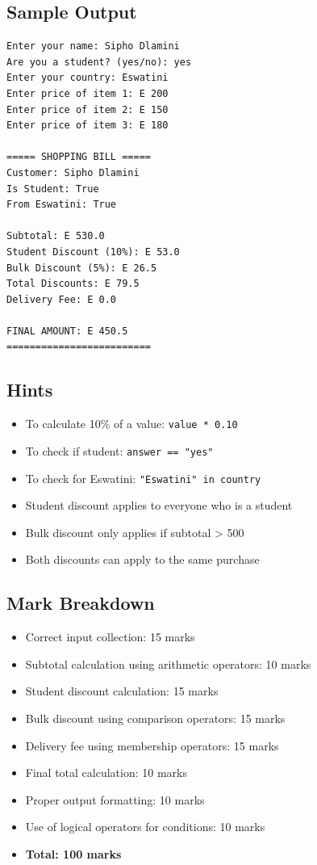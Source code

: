 \documentclass[a4paper,11pt]{article}
\theoremstyle{mytheor}
\begin{document}
\subsection*{Sample Output}

\begin{lstlisting}
Enter your name: Sipho Dlamini
Are you a student? (yes/no): yes
Enter your country: Eswatini
Enter price of item 1: E 200
Enter price of item 2: E 150
Enter price of item 3: E 180

===== SHOPPING BILL =====
Customer: Sipho Dlamini
Is Student: True
From Eswatini: True

Subtotal: E 530.0
Student Discount (10%): E 53.0
Bulk Discount (5%): E 26.5
Total Discounts: E 79.5
Delivery Fee: E 0.0

FINAL AMOUNT: E 450.5
=========================
\end{lstlisting}

\subsection*{Hints}

\begin{itemize}
    \item To calculate 10\% of a value: \texttt{value * 0.10}
    \item To check if student: \texttt{answer == "yes"}
    \item To check for Eswatini: \texttt{"Eswatini" in country}
    \item Student discount applies to everyone who is a student
    \item Bulk discount only applies if subtotal > 500
    \item Both discounts can apply to the same purchase
\end{itemize}

\subsection*{Mark Breakdown}
\begin{itemize}
    \item Correct input collection: 15 marks
    \item Subtotal calculation using arithmetic operators: 10 marks
    \item Student discount calculation: 15 marks
    \item Bulk discount using comparison operators: 15 marks
    \item Delivery fee using membership operators: 15 marks
    \item Final total calculation: 10 marks
    \item Proper output formatting: 10 marks
    \item Use of logical operators for conditions: 10 marks
    \item \textbf{Total: 100 marks}
\end{itemize}
\end{document}
